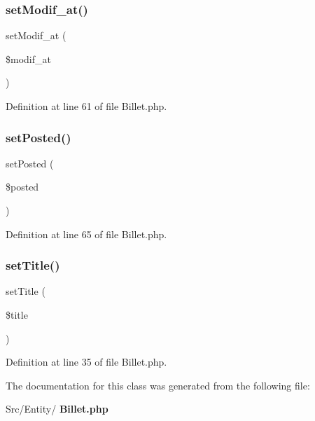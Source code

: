 \subsubsection{set\+Modif\+\_\+at()}
{\footnotesize\ttfamily set\+Modif\+\_\+at (\begin{DoxyParamCaption}\item[{Date\+Time}]{\$modif\+\_\+at }\end{DoxyParamCaption})}



Definition at line 61 of file Billet.\+php.

\mbox{\label{class_src_1_1_entity_1_1_billet_acee4aedcde0f95ac298a1a0ce86be082}} 
\subsubsection{set\+Posted()}
{\footnotesize\ttfamily set\+Posted (\begin{DoxyParamCaption}\item[{}]{\$posted }\end{DoxyParamCaption})}



Definition at line 65 of file Billet.\+php.

\mbox{\label{class_src_1_1_entity_1_1_billet_a884ba9bb0d54bde7839e798db7964476}} 
\subsubsection{set\+Title()}
{\footnotesize\ttfamily set\+Title (\begin{DoxyParamCaption}\item[{}]{\$title }\end{DoxyParamCaption})}



Definition at line 35 of file Billet.\+php.



The documentation for this class was generated from the following file\+:\begin{DoxyCompactItemize}
\item 
Src/\+Entity/\textbf{ Billet.\+php}\end{DoxyCompactItemize}
